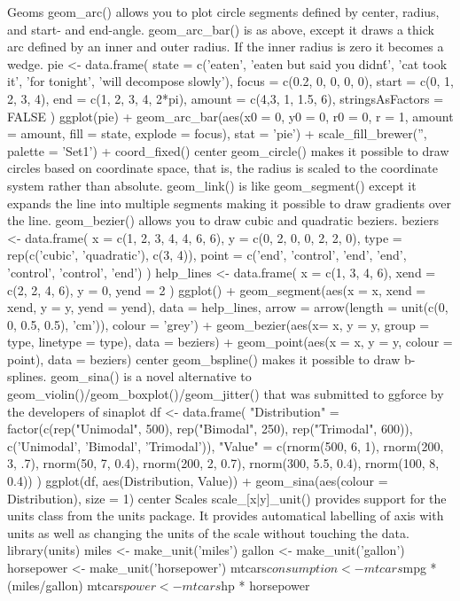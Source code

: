 Geoms
geom_arc() allows you to plot circle segments defined by center, radius, and
start- and end-angle.
geom_arc_bar() is as above, except it draws a thick arc defined by an
inner and outer radius. If the inner radius is zero it becomes a wedge.
pie <- data.frame(
    state = c('eaten', 'eaten but said you didn\'t', 'cat took it', 
              'for tonight', 'will decompose slowly'),
    focus = c(0.2, 0, 0, 0, 0),
    start = c(0, 1, 2, 3, 4),
    end = c(1, 2, 3, 4, 2*pi),
    amount = c(4,3, 1, 1.5, 6),
    stringsAsFactors = FALSE
)
ggplot(pie) + 
    geom_arc_bar(aes(x0 = 0, y0 = 0, r0 = 0, r = 1, amount = amount, 
                     fill = state, explode = focus), stat = 'pie') + 
    scale_fill_brewer('', palette = 'Set1') +
    coord_fixed()
center
geom_circle() makes it possible to draw circles based on coordinate space,
that is, the radius is scaled to the coordinate system rather than absolute.
geom_link() is like geom_segment() except it expands the line into
multiple segments making it possible to draw gradients over the line.
geom_bezier() allows you to draw cubic and quadratic beziers.
beziers <- data.frame(
    x = c(1, 2, 3, 4, 4, 6, 6),
    y = c(0, 2, 0, 0, 2, 2, 0),
    type = rep(c('cubic', 'quadratic'), c(3, 4)),
    point = c('end', 'control', 'end', 'end', 'control', 'control', 'end')
)
help_lines <- data.frame(
    x = c(1, 3, 4, 6),
    xend = c(2, 2, 4, 6),
    y = 0,
    yend = 2
)
ggplot() + geom_segment(aes(x = x, xend = xend, y = y, yend = yend), 
                        data = help_lines, 
                        arrow = arrow(length = unit(c(0, 0, 0.5, 0.5), 'cm')), 
                        colour = 'grey') + 
    geom_bezier(aes(x= x, y = y, group = type, linetype = type), 
                data = beziers) + 
    geom_point(aes(x = x, y = y, colour = point), data = beziers)
center
geom_bspline() makes it possible to draw b-splines.
geom_sina() is a novel alternative to geom_violin()/geom_boxplot()/geom_jitter()
that was submitted to ggforce by the developers of
sinaplot
df <- data.frame(
  "Distribution" = factor(c(rep("Unimodal", 500),
                     rep("Bimodal", 250),
                     rep("Trimodal", 600)), c('Unimodal', 'Bimodal', 'Trimodal')),
  "Value" = c(rnorm(500, 6, 1),
              rnorm(200, 3, .7), rnorm(50, 7, 0.4),
              rnorm(200, 2, 0.7), rnorm(300, 5.5, 0.4), rnorm(100, 8, 0.4))
)
ggplot(df, aes(Distribution, Value)) + 
    geom_sina(aes(colour = Distribution), size = 1)
center
Scales
scale_[x|y]_unit() provides support for the units class from the units package. It provides
automatical labelling of axis with units as well as changing the units of the
scale without touching the data.
library(units)
miles <- make_unit('miles')
gallon <- make_unit('gallon')
horsepower <- make_unit('horsepower')
mtcars$consumption <- mtcars$mpg * (miles/gallon)
mtcars$power <- mtcars$hp * horsepower

